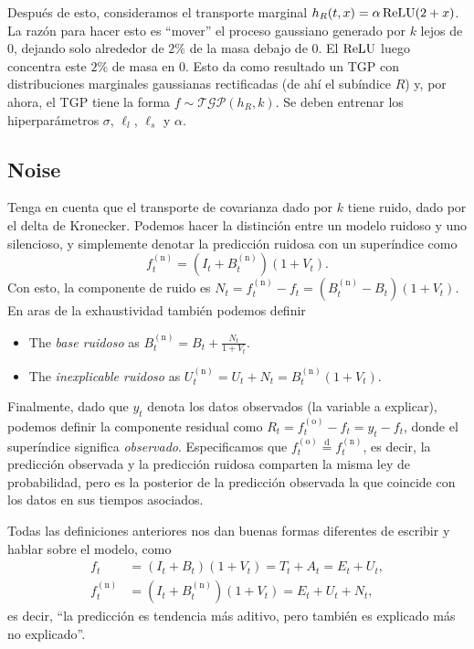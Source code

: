 Después de esto, consideramos el transporte marginal \( h_R(t, x) = \alpha \operatorname{ReLU}(2 + x) \). La razón para hacer esto es ``mover'' el proceso gaussiano generado por \(k\) lejos de \(0\), dejando solo alrededor de \(2\%\) de la masa debajo de \(0\). El \(\operatorname{ReLU}\) luego concentra este \(2\%\) de masa en \(0\). Esto da como resultado un TGP con distribuciones marginales gaussianas rectificadas (de ahí el subíndice \(R\)) y, por ahora, el TGP tiene la forma \( f \sim \mathcal{TGP}(h_R, k) \). Se deben entrenar los hiperparámetros $\sigma$, $\ell_l$, $\ell_s$ y $\alpha$.

\subsection{Noise}
Tenga en cuenta que el transporte de covarianza dado por \(k\) tiene ruido, dado por el delta de Kronecker. Podemos hacer la distinción entre un modelo ruidoso y uno silencioso, y simplemente denotar la predicción ruidosa con un superíndice como
\[f^{\mathrm{(n)}}_t = (I_t + B^{\mathrm{(n)}}_t) (1 + V_t).\]
Con esto, la componente de ruido es \(N_t = f_t^{\mathrm{(n)}} - f_t = (B^{\mathrm{(n)}}_t - B_t) (1 + V_t)\). En aras de la exhaustividad también podemos definir
\begin{itemize}
	\item The \emph{base ruidoso} as \(B^{\mathrm{(n)}}_t = B_t + \frac{N_t}{1 + V_t}\).
	\item The \emph{inexplicable ruidoso} as \(U^{\mathrm{(n)}}_t = U_t + N_t = B^{\mathrm{(n)}}_t (1 + V_t)\).
\end{itemize}
Finalmente, dado que \(y_t\) denota los datos observados (la variable a explicar), podemos definir la componente residual como \(R_t = f^{\mathrm{(o)}}_t - f_t = y_t - f_t\), donde el superíndice significa \emph{observado}. Especificamos que \( f^{\mathrm{(o)}}_t \stackrel{\mathrm{d}}{=} f^{\mathrm{(n)}}_t \), es decir, la predicción observada y la predicción ruidosa comparten la misma ley de probabilidad, pero es la posterior de la predicción observada la que coincide con los datos en sus tiempos asociados.

Todas las definiciones anteriores nos dan buenas formas diferentes de escribir y hablar sobre el modelo, como
\begin{align*}
f_t					&= (I_t + B_t) (1 + V_t) = T_t + A_t = E_t + U_t,\\
f_t^{\mathrm{(n)}}	&= (I_t + B^\mathrm{(n)}_t) (1 + V_t) = E_t + U_t + N_t,
\end{align*}
es decir, ``la predicción es tendencia más aditivo, pero también es explicado más no explicado''.

